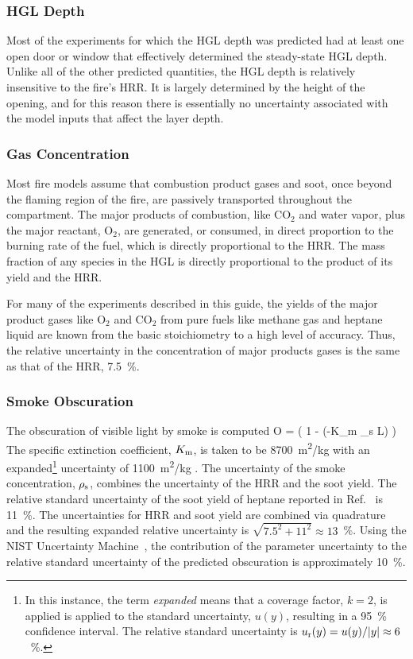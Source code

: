 \subsubsection{HGL Depth}

Most of the experiments for which the HGL depth was predicted had at least one open door or window that effectively determined the steady-state HGL depth. Unlike all of the other predicted quantities, the HGL depth is relatively insensitive to the fire's HRR. It is largely determined by the height of the opening, and for this reason there is essentially no uncertainty associated with the model inputs that affect the layer depth.

\subsubsection{Gas Concentration}

Most fire models assume that combustion product gases and soot, once beyond the flaming region of the fire, are passively transported throughout the compartment. The major products of combustion, like CO$_2$ and water vapor, plus the major reactant, O$_2$, are generated, or consumed, in direct proportion to the burning rate of the fuel, which is directly proportional to the HRR. The mass fraction of any species in the HGL is directly proportional to the product of its yield and the HRR.

For many of the experiments described in this guide, the yields of the major product gases like O$_2$ and CO$_2$ from pure fuels like methane gas and heptane liquid are known from the basic stoichiometry to a high level of accuracy. Thus, the relative uncertainty in the concentration of major products gases is the same as that of the HRR, 7.5~\%. 

\subsubsection{Smoke Obscuration}

The obscuration of visible light by smoke is computed
\be
   O = \left( 1 - \exp(-K_{\rm m} \rho_{\rm s} L) \right)  
\ee
The specific extinction coefficient, $K_{\rm m}$, is taken to be 8700~\unit{m^2/kg} with an expanded\footnote{In this instance, the term {\it expanded} means that a coverage factor, $k=2$, is applied is applied to the standard uncertainty, $u(y)$, resulting in a 95~\% confidence interval. The relative standard uncertainty is $u_{\rm r}(y)=u(y)/|y|\approx 6$~\%.} uncertainty of 1100~\unit{m^2/kg} \cite{Mulholland:F+M}. The uncertainty of the smoke concentration, $\rho_{\rm s}$, combines the uncertainty of the HRR and the soot yield. The relative standard uncertainty of the soot yield of heptane reported in Ref.~\cite{Hamins:SP1013-1} is 11~\%. The uncertainties for HRR and soot yield are combined via quadrature and the resulting expanded relative uncertainty is $\sqrt{7.5^2+11^2} \approx 13$~\%. Using the NIST Uncertainty Machine~\cite{NIST_Uncertainty_Machine}, the contribution of the parameter uncertainty to the relative standard uncertainty of the predicted obscuration is approximately 10~\%.

